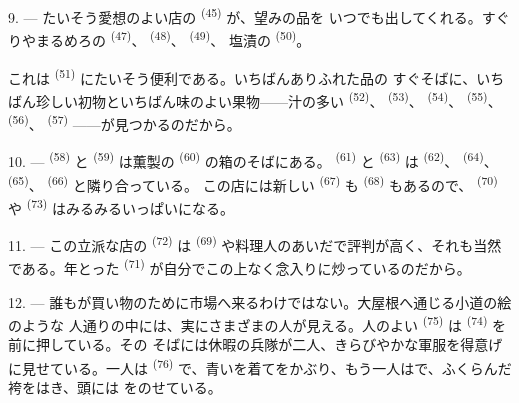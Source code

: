 9. --- たいそう愛想のよい店の \textsuperscript{(45)} が、望みの品を
いつでも出してくれる。すぐりやまるめろの \textsuperscript{(47)}、
 \textsuperscript{(48)}、 \textsuperscript{(49)}、
塩漬の \textsuperscript{(50)}。

これは \textsuperscript{(51)} にたいそう便利である。いちばんありふれた品の
すぐそばに、いちばん珍しい初物といちばん味のよい果物——汁の多い
\textsuperscript{(52)}、 \textsuperscript{(53)}、
\textsuperscript{(54)}、 \textsuperscript{(55)}、
\textsuperscript{(56)}、 \textsuperscript{(57)} ——が見つかるのだから。

\VUsaut{4.0mm}
\VUsaut{3.0mm}

10. ---  \textsuperscript{(58)} と \textsuperscript{(59)}
は薫製の \textsuperscript{(60)} の箱のそばにある。
\textsuperscript{(61)} と \textsuperscript{(63)} は
\textsuperscript{(62)}、 \textsuperscript{(64)}、
\textsuperscript{(65)}、 \textsuperscript{(66)} と隣り合っている。
この店には新しい \textsuperscript{(67)} も
\textsuperscript{(68)} もあるので、 \textsuperscript{(70)} や
 \textsuperscript{(73)} はみるみるいっぱいになる。

11. --- この立派な店の \textsuperscript{(72)} は
\textsuperscript{(69)} や料理人のあいだで評判が高く、それも当然である。年とった
 \textsuperscript{(71)} が自分でこの上なく念入りに炒っているのだから。

\VUsaut{4.0mm}
\VUsaut{3.0mm}

12. --- 誰もが買い物のために市場へ来るわけではない。大屋根へ通じる小道の絵のような
人通りの中には、実にさまざまの人が見える。人のよい
\textsuperscript{(75)} は \textsuperscript{(74)} を前に押している。その
そばには休暇の兵隊が二人、きらびやかな軍服を得意げに見せている。一人は
 \textsuperscript{(76)} で、青いを着てをかぶり、もう一人はで、ふくらんだ袴をはき、頭には
をのせている。


